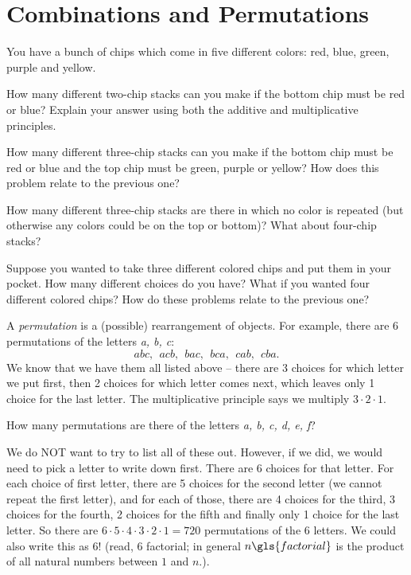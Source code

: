 \documentclass[12pt]{article}
\begin{document}
\section{Combinations and Permutations}\label{sec:comb-perm}

\begin{activity}
You have a bunch of chips which come in five different colors: red, blue, green, purple and yellow.
\begin{questions} 

\question How many different two-chip stacks can you make if the bottom chip must be red or blue?  Explain your answer using both the additive and multiplicative principles.

\question How many different three-chip stacks can you make if the bottom chip must be red or blue and the top chip must be green, purple or yellow?  How does this problem relate to the previous one?

\question How many different three-chip stacks are there in which no color is repeated (but otherwise any colors could be on the top or bottom)? What about four-chip stacks?

\question Suppose you wanted to take three different colored chips and put them in your pocket.  How many different choices do you have?  What if you wanted four different colored chips?  How do these problems relate to the previous one?

\end{questions}
\end{activity}

A {\em permutation} is a (possible) rearrangement of objects.  For example, there are 6 permutations of the letters \textit{a, b, c}:
\[abc, ~~ acb, ~~ bac, ~~bca, ~~ cab, ~~ cba.\]
We know that we have them all listed above -- there are 3 choices for which letter we put first, then 2 choices for which letter comes next, which leaves only 1 choice for the last letter.  The multiplicative principle says we multiply $3\cdot 2 \cdot 1$.

\begin{example}
  How many permutations are there of the letters \textit{a, b, c, d, e, f}?
  \begin{solution}
    We do NOT want to try to list all of these out.  However, if we did, we would need to pick a letter to write down first.  There are 6 choices for that letter.  For each choice of first letter, there are 5 choices for the second letter (we cannot repeat the first letter), and for each of those, there are 4 choices for the third, 3 choices for the fourth, 2 choices for the fifth and finally only 1 choice for the last letter.  So there are $6 \cdot 5 \cdot 4 \cdot 3 \cdot 2 \cdot 1 = 720$ permutations of the 6 letters.  We could also write this as $6!$ (read, 6 factorial; in general $n\gls{factorial}$ is the product of all natural numbers between $1$ and $n$.).
  \end{solution}
\end{example}
\end{document}
